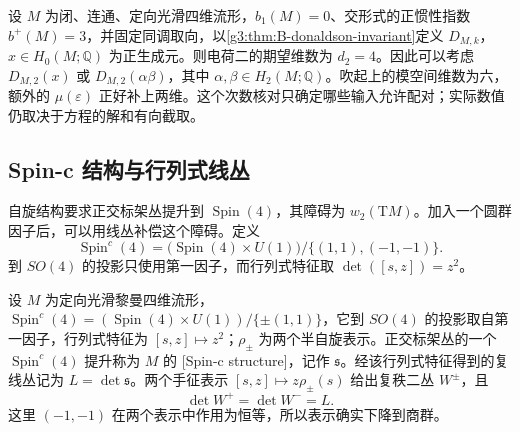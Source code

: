 \begin{example}\label{g3:exm:B-donaldson-degrees}
 设 \(M\) 为闭、连通、定向光滑四维流形，\(b_1(M)=0\)、交形式的正惯性指数 \(b^+(M)=3\)，并固定同调取向，以\cref{g3:thm:B-donaldson-invariant}定义 \(D_{M,k}\)，\(x\in H_0(M;\mathbb Q)\) 为正生成元。则电荷二的期望维数为 \(d_2=4\)。因此可以考虑 \(D_{M,2}(x)\) 或 \(D_{M,2}(\alpha\beta)\)，其中 \(\alpha,\beta\in H_2(M;\mathbb Q)\)。吹起上的模空间维数为六，额外的 \(\mu(\varepsilon)\) 正好补上两维。这个次数核对只确定哪些输入允许配对；实际数值仍取决于方程的解和有向截取。
\end{example}

\subsection{Spin-c 结构与行列式线丛}
\label{g3:subsec:B04:04}

自旋结构要求正交标架丛提升到 \(\operatorname{Spin}(4)\)，其障碍为 \(w_2(\mathrm TM)\)。加入一个圆群因子后，可以用线丛补偿这个障碍。定义
\[
 \operatorname{Spin}^c(4)
 =\bigl(\operatorname{Spin}(4)\times U(1)\bigr)/\{(1,1),(-1,-1)\}.
\]
到 \(SO(4)\) 的投影只使用第一因子，而行列式特征取
\(\det([s,z])=z^2\)。

\begin{definition}\label{g3:def:B-spinc-structure}
 设 \(M\) 为定向光滑黎曼四维流形，\(\operatorname{Spin}^c(4)=(\operatorname{Spin}(4)\times U(1))/\{\pm(1,1)\}\)，它到 \(SO(4)\) 的投影取自第一因子，行列式特征为 \([s,z]\mapsto z^2\)；\(\rho_\pm\) 为两个半自旋表示。正交标架丛的一个
 \(\operatorname{Spin}^c(4)\) 提升称为 \(M\) 的
 [Spin-c structure]，记作 \(\mathfrak s\)。经该行列式特征得到的复线丛记为 \(L=\det\mathfrak s\)。两个手征表示 \([s,z]\mapsto z\rho_\pm(s)\) 给出复秩二丛 \(W^\pm\)，且
 \[
 \det W^+=\det W^-=L.
 \]
 这里 \((-1,-1)\) 在两个表示中作用为恒等，所以表示确实下降到商群。
\end{definition}

